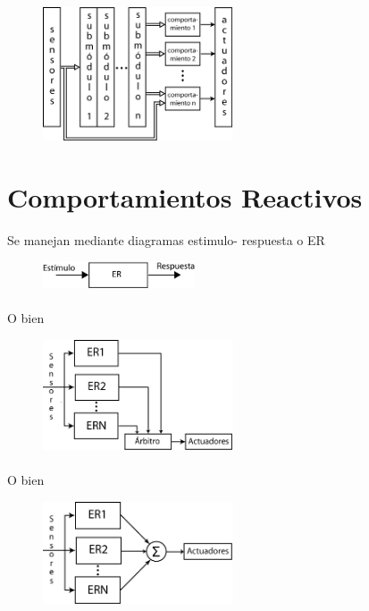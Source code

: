\begin{figure}[h!]
	\centering
	\includegraphics[width=0.5\textwidth]{images/img6.png}
	\label{figura6}
\end{figure}



\section{Comportamientos Reactivos}

Se manejan mediante diagramas estimulo- respuesta o ER

\begin{figure}[h!]
	\centering
	\includegraphics[width=0.4\textwidth]{images/img7.png}
	\label{figura7}
\end{figure}

\paragraph{}
O bien

\begin{figure}[h!]
	\centering
	\includegraphics[width=0.5\textwidth]{images/img8.png}
	\label{figura8}
\end{figure}

\paragraph{}
O bien

\begin{figure}[h!]
	\centering
	\includegraphics[width=0.5\textwidth]{images/img9.png}
	\label{figura9}
\end{figure}


